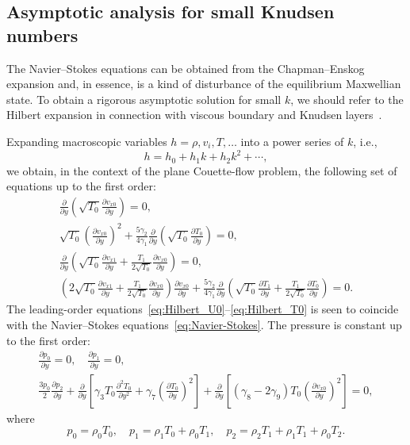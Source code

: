 \documentclass[]{jfm}
\newcommand{\pder}[2][]{\frac{\partial#1}{\partial#2}}
\newcommand{\pderdual}[2][]{\frac{\partial^2#1}{\partial#2^2}}
\begin{document}
\subsection{Asymptotic analysis for small Knudsen numbers}

The Navier--Stokes equations can be obtained from the Chapman--Enskog expansion
and, in essence, is a kind of disturbance of the equilibrium Maxwellian state.
To obtain a rigorous asymptotic solution for small \(k\),
we should refer to the Hilbert expansion in connection with
viscous boundary and Knudsen layers~\citep{Sone2000, Sone2002}.

Expanding macroscopic variables \(h = \rho, v_i, T, \dots\) into a power series of \(k\), i.e.,
\begin{equation}\label{eq:hilbert_expansion}
    h = h_0 + h_1k + h_2k^2 + \cdots,
\end{equation}
we obtain, in the context of the plane Couette-flow problem, the following set of equations up to the first order:
\begin{gather}
    \pder{y}\left( \sqrt{T_0}\pder[v_{x0}]{y} \right) = 0, \label{eq:Hilbert_U0}\\
    \sqrt{T_0}\left( \pder[v_{x0}]{y}\right)^2 + \frac{5\gamma_2}{4\gamma_1}\pder{y}\left(\sqrt{T_0}\pder[T_0]{y} \right) = 0, \label{eq:Hilbert_T0}\\
    \pder{y}\left( \sqrt{T_0}\pder[v_{x1}]{y} + \frac{T_1}{2\sqrt{T_0}}\pder[v_{x0}]{y} \right) = 0, \label{eq:Hilbert_U1}\\
    \left( 2\sqrt{T_0}\pder[v_{x1}]{y} + \frac{T_1}{2\sqrt{T_0}}\pder[v_{x0}]{y} \right) \pder[v_{x0}]{y}
        + \frac{5\gamma_2}{4\gamma_1} \pder{y}\left( \sqrt{T_0}\pder[T_1]{y} + \frac{T_1}{2\sqrt{T_0}}\pder[T_0]{y} \right) = 0. \label{eq:Hilbert_T1}
\end{gather}
The leading-order equations~\eqref{eq:Hilbert_U0}--\eqref{eq:Hilbert_T0}
is seen to coincide with the Navier--Stokes equations~\eqref{eq:Navier-Stokes}.
The pressure is constant up to the first order:
\begin{gather}
    \pder[p_0]{y} = 0, \quad \pder[p_1]{y} = 0, \label{eq:hilbert_p0_p1} \\
    \frac{3p_0}{2}\pder[p_2]{y}
        + \pder{y}\left[ \gamma_3 T_0 \pderdual[T_0]{y} + \gamma_7\left(\pder[T_0]{y}\right)^2 \right]
        + \pder{y}\left[ (\gamma_8-2\gamma_9)T_0\left(\pder[v_{x0}]{y}\right)^2 \right] = 0, \label{eq:hilbert_p2}
\end{gather}
where
\begin{equation}\label{eq:hilbert_expansion_p}
    p_0 = \rho_0 T_0, \quad
    p_1 = \rho_1 T_0 + \rho_0 T_1, \quad
    p_2 = \rho_2 T_1 + \rho_1 T_1 + \rho_0 T_2.
\end{equation}
\end{document}

